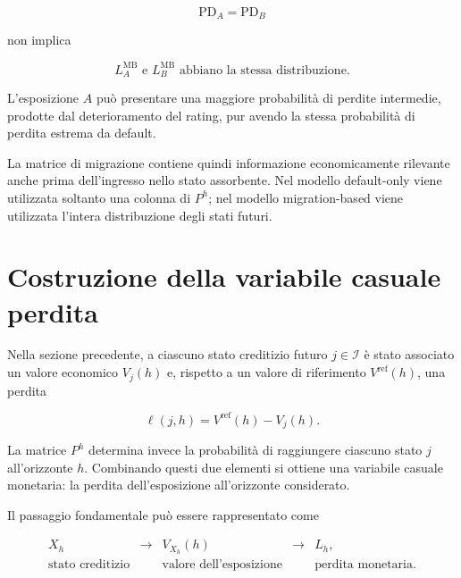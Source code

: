 \[
\mathrm{PD}_A
=
\mathrm{PD}_B
\]

non implica

\[
L_A^{\mathrm{MB}}
\text{ e }
L_B^{\mathrm{MB}}
\text{ abbiano la stessa distribuzione}.
\]

L'esposizione $A$ pu\`{o} presentare una maggiore probabilit\`{a} di
perdite intermedie, prodotte dal deterioramento del rating, pur avendo
la stessa probabilit\`{a} di perdita estrema da default.

La matrice di migrazione contiene quindi informazione economicamente
rilevante anche prima dell'ingresso nello stato assorbente. Nel modello
default-only viene utilizzata soltanto una colonna di $P^h$; nel
modello migration-based viene utilizzata l'intera distribuzione degli
stati futuri.






\section{Costruzione della variabile casuale perdita}

\label{sec:cap9-variabile-perdita}

Nella sezione precedente, a ciascuno stato creditizio futuro
$j\in\mathcal{I}$ \`{e} stato associato un valore economico
$V_j(h)$ e, rispetto a un valore di riferimento
$V^{\mathrm{ref}}(h)$, una perdita

\[
\ell(j,h)
=
V^{\mathrm{ref}}(h)-V_j(h).
\]

La matrice $P^h$ determina invece la probabilit\`{a} di raggiungere
ciascuno stato $j$ all'orizzonte $h$. Combinando questi due
elementi si ottiene una variabile casuale monetaria: la perdita
dell'esposizione all'orizzonte considerato.

Il passaggio fondamentale pu\`{o} essere rappresentato come

\[
\begin{array}{ccccc}
X_h
&
\longrightarrow
&
V_{X_h}(h)
&
\longrightarrow
&
L_h,
\\[1mm]
\text{stato creditizio}
&&
\text{valore dell'esposizione}
&&
\text{perdita monetaria}.
\end{array}
\]

